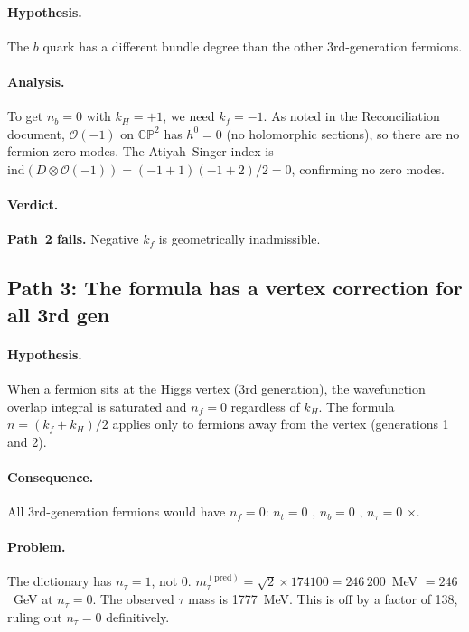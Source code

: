\documentclass[11pt,a4paper]{article}
\newcommand{\CP}{\mathbb{CP}}
\newcommand{\ind}{\mathrm{ind}}
\theoremstyle{definition}
\theoremstyle{remark}
\begin{document}
\paragraph{Hypothesis.}  The $b$ quark has a different bundle degree than
the other 3rd-generation fermions.

\paragraph{Analysis.}  To get $n_b = 0$ with $k_H = +1$, we need
$k_f = -1$.  As noted in the Reconciliation document, $\mathcal{O}(-1)$
on $\CP^2$ has $h^0 = 0$ (no holomorphic sections), so there are no
fermion zero modes.  The Atiyah--Singer index is
$\ind(D \otimes \mathcal{O}(-1)) = (-1+1)(-1+2)/2 = 0$, confirming no
zero modes.

\paragraph{Verdict.}  \textbf{Path~2 fails.}  Negative $k_f$ is
geometrically inadmissible.

\subsection{Path 3: The formula has a vertex correction for all 3rd gen}
\label{sec:path3}

\paragraph{Hypothesis.}  When a fermion sits at the Higgs vertex (3rd
generation), the wavefunction overlap integral is saturated and $n_f = 0$
regardless of $k_H$.  The formula $n = (k_f + k_H)/2$ applies only to
fermions away from the vertex (generations 1 and 2).

\paragraph{Consequence.}  All 3rd-generation fermions would have $n_f = 0$:
$n_t = 0$ \checkmark, $n_b = 0$ \checkmark, $n_\tau = 0$ $\times$.

\paragraph{Problem.}  The dictionary has $n_\tau = 1$, not 0.
$m_\tau^{(\text{pred})} = \sqrt{2}\times 174100 = 246\,200$~MeV $= 246$~GeV
at $n_\tau = 0$.  The observed $\tau$ mass is 1777~MeV.  This is off by
a factor of 138, ruling out $n_\tau = 0$ definitively.
\end{document}
